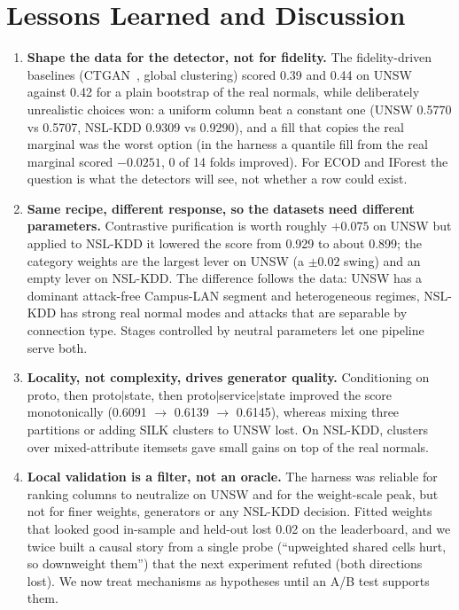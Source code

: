 \documentclass[10pt,a4paper]{article}
\begin{document}
\section{Lessons Learned and Discussion}\label{sec:lessons}
\begin{enumerate}[label=\textbf{L\arabic*.},leftmargin=2.0em]
\item \textbf{Shape the data for the detector, not for fidelity.} The fidelity-driven baselines (CTGAN~\cite{ctgan}, global clustering) scored 0.39 and 0.44 on UNSW against 0.42 for a plain bootstrap of the real normals, while deliberately unrealistic choices won: a uniform column beat a constant one (UNSW 0.5770 vs 0.5707, NSL-KDD 0.9309 vs 0.9290), and a fill that copies the real marginal was the worst option (in the harness a quantile fill from the real marginal scored $-0.0251$, 0 of 14 folds improved). For ECOD and IForest the question is what the detectors will see, not whether a row could exist.
\item \textbf{Same recipe, different response, so the datasets need different parameters.} Contrastive purification is worth roughly $+0.075$ on UNSW but applied to NSL-KDD it lowered the score from 0.929 to about 0.899; the category weights are the largest lever on UNSW (a $\pm0.02$ swing) and an empty lever on NSL-KDD. The difference follows the data: UNSW has a dominant attack-free Campus-LAN segment and heterogeneous regimes, NSL-KDD has strong real normal modes and attacks that are separable by connection type. Stages controlled by neutral parameters let one pipeline serve both.
\item \textbf{Locality, not complexity, drives generator quality.} Conditioning on proto, then proto$|$state, then proto$|$service$|$state improved the score monotonically (0.6091 $\to$ 0.6139 $\to$ 0.6145), whereas mixing three partitions or adding SILK clusters to UNSW lost. On NSL-KDD, clusters over mixed-attribute itemsets gave small gains on top of the real normals.
\item \textbf{Local validation is a filter, not an oracle.} The harness was reliable for ranking columns to neutralize on UNSW and for the weight-scale peak, but not for finer weights, generators or any NSL-KDD decision. Fitted weights that looked good in-sample and held-out lost 0.02 on the leaderboard, and we twice built a causal story from a single probe (``upweighted shared cells hurt, so downweight them'') that the next experiment refuted (both directions lost). We now treat mechanisms as hypotheses until an A/B test supports them.

\end{enumerate}
\end{document}
